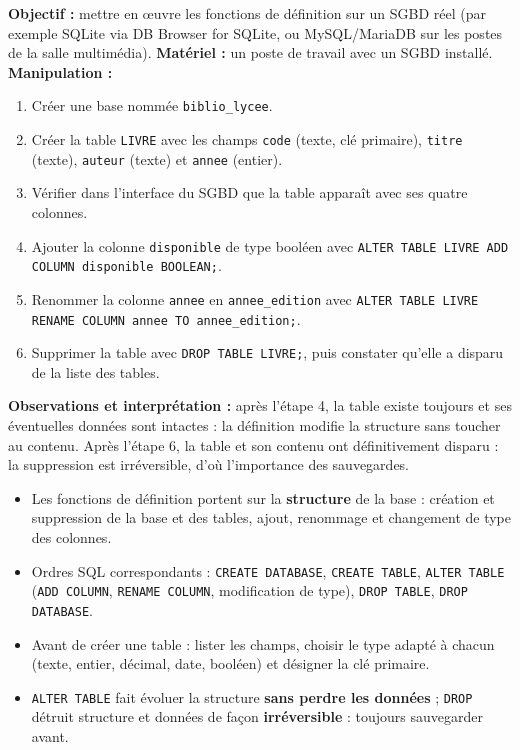 \documentclass[11pt]{article}
\begin{document}
\begin{experience}
\textbf{Objectif :} mettre en œuvre les fonctions de définition sur un SGBD réel (par exemple SQLite via DB Browser for SQLite, ou MySQL/MariaDB sur les postes de la salle multimédia).
\textbf{Matériel :} un poste de travail avec un SGBD installé.
\textbf{Manipulation :}
\begin{enumerate}
\item Créer une base nommée \texttt{biblio\_lycee}.
\item Créer la table \texttt{LIVRE} avec les champs \texttt{code} (texte, clé primaire), \texttt{titre} (texte), \texttt{auteur} (texte) et \texttt{annee} (entier).
\item Vérifier dans l'interface du SGBD que la table apparaît avec ses quatre colonnes.
\item Ajouter la colonne \texttt{disponible} de type booléen avec \texttt{ALTER TABLE LIVRE ADD COLUMN disponible BOOLEAN;}.
\item Renommer la colonne \texttt{annee} en \texttt{annee\_edition} avec \texttt{ALTER TABLE LIVRE RENAME COLUMN annee TO annee\_edition;}.
\item Supprimer la table avec \texttt{DROP TABLE LIVRE;}, puis constater qu'elle a disparu de la liste des tables.
\end{enumerate}
\textbf{Observations et interprétation :} après l'étape 4, la table existe toujours et ses éventuelles données sont intactes : la définition modifie la structure sans toucher au contenu. Après l'étape 6, la table et son contenu ont définitivement disparu : la suppression est irréversible, d'où l'importance des sauvegardes.
\end{experience}

\begin{aretenir}
\begin{itemize}
\item Les fonctions de définition portent sur la \textbf{structure} de la base : création et suppression de la base et des tables, ajout, renommage et changement de type des colonnes.
\item Ordres SQL correspondants : \texttt{CREATE DATABASE}, \texttt{CREATE TABLE}, \texttt{ALTER TABLE} (\texttt{ADD COLUMN}, \texttt{RENAME COLUMN}, modification de type), \texttt{DROP TABLE}, \texttt{DROP DATABASE}.
\item Avant de créer une table : lister les champs, choisir le type adapté à chacun (texte, entier, décimal, date, booléen) et désigner la clé primaire.
\item \texttt{ALTER TABLE} fait évoluer la structure \textbf{sans perdre les données} ; \texttt{DROP} détruit structure et données de façon \textbf{irréversible} : toujours sauvegarder avant.
\end{itemize}
\end{aretenir}
\end{document}
